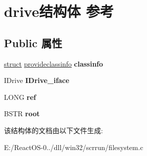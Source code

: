 \hypertarget{structdrive}{}\section{drive结构体 参考}
\label{structdrive}
\subsection*{Public 属性}
\begin{DoxyCompactItemize}
\item 
\mbox{\label{structdrive_a0d1530e49c756a73000abfe4894f0ab4}} 
\hyperlink{interfacestruct}{struct} \hyperlink{structprovideclassinfo}{provideclassinfo} {\bfseries classinfo}
\item 
\mbox{\label{structdrive_a935fb6038e7b20bb882e8abf6185e159}} 
I\+Drive {\bfseries I\+Drive\+\_\+iface}
\item 
\mbox{\label{structdrive_a629b81b92fbbfd32cda10b5365207039}} 
L\+O\+NG {\bfseries ref}
\item 
\mbox{\label{structdrive_a693da028b328dc0d4c03b0631275ce4c}} 
B\+S\+TR {\bfseries root}
\end{DoxyCompactItemize}


该结构体的文档由以下文件生成\+:\begin{DoxyCompactItemize}
\item 
E\+:/\+React\+O\+S-\/0../dll/win32/scrrun/filesystem.\+c\end{DoxyCompactItemize}
